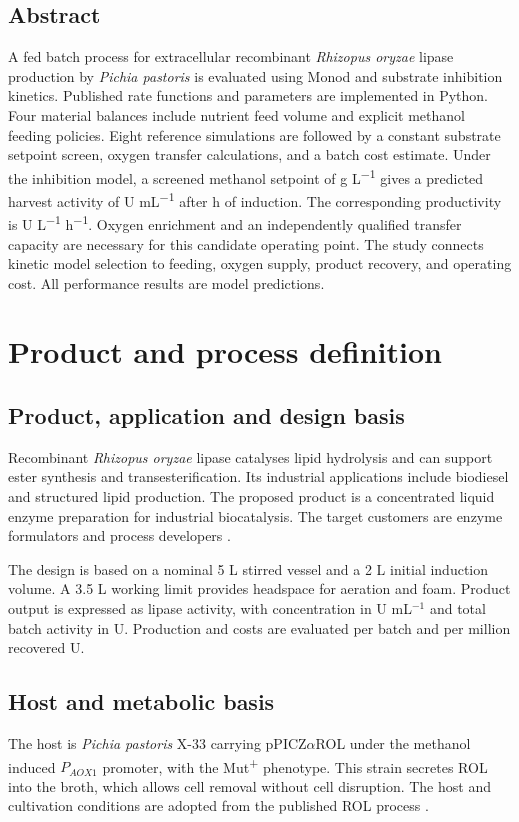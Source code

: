 \documentclass[12pt,a4paper]{article}
\newcommand{\pp}{\textit{Pichia pastoris}}
\newcommand{\rol}{\textit{Rhizopus oryzae} lipase}
\begin{document}
\subsection*{Abstract}
A fed batch process for extracellular recombinant \rol{} production by \pp{} is evaluated using Monod and substrate inhibition kinetics. Published rate functions and parameters are implemented in Python. Four material balances include nutrient feed volume and explicit methanol feeding policies. Eight reference simulations are followed by a constant substrate setpoint screen, oxygen transfer calculations, and a batch cost estimate. Under the inhibition model, a screened methanol setpoint of \Setpoint{} g L\textsuperscript{\(-1\)} gives a predicted harvest activity of \FinalActivity{} U mL\textsuperscript{\(-1\)} after \FinalTime{} h of induction. The corresponding productivity is \FinalProductivity{} U L\textsuperscript{\(-1\)} h\textsuperscript{\(-1\)}. Oxygen enrichment and an independently qualified transfer capacity are necessary for this candidate operating point. The study connects kinetic model selection to feeding, oxygen supply, product recovery, and operating cost. All performance results are model predictions.
\par\endgroup

\newpage
\section{Product and process definition}
\subsection{Product, application and design basis}
Recombinant \rol{} catalyses lipid hydrolysis and can support ester synthesis and transesterification. Its industrial applications include biodiesel and structured lipid production. The proposed product is a concentrated liquid enzyme preparation for industrial biocatalysis. The target customers are enzyme formulators and process developers \cite{PonteThesis,Lopez2019}.

The design is based on a nominal 5 L stirred vessel and a 2 L initial induction volume. A 3.5 L working limit provides headspace for aeration and foam. Product output is expressed as lipase activity, with concentration in U mL$^{-1}$ and total batch activity in U. Production and costs are evaluated per batch and per million recovered U.

\subsection{Host and metabolic basis}
The host is \pp{} X-33 carrying pPICZ$\alpha$ROL under the methanol induced $P_{AOX1}$ promoter, with the Mut\textsuperscript{+} phenotype. This strain secretes ROL into the broth, which allows cell removal without cell disruption. The host and cultivation conditions are adopted from the published ROL process \cite{PonteThesis}.
\end{document}
